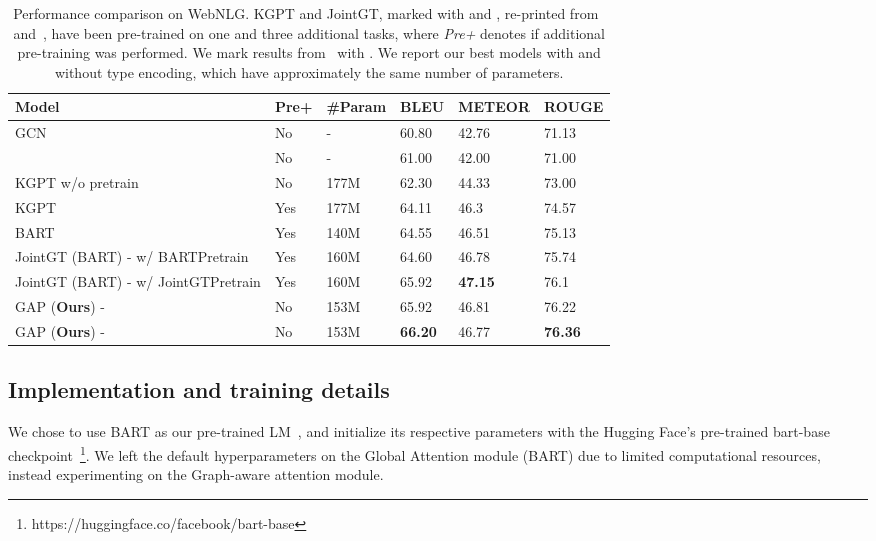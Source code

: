 \documentclass[11pt]{article}
\begin{document}
\begin{table*}[t]
\centering
\begin{tabular}{l|l|llll}
\hline
Model                                                           & Pre+ &\#Param & BLEU             & METEOR                    & ROUGE            \\ \hline
GCN~\cite{marcheggiani2018deep}                                                      & No & -      & 60.80  & 42.76            & 71.13  \\ ~\citet{shimorina2018handling}                                                      & No & -      & 61.00  & 42.00           & 71.00  \\ 

KGPT w/o pretrain & No                                                   & 177M      & 62.30   & 44.33            & 73.00  \\ 

KGPT & Yes                                                            & 177M   & 64.11 & 46.3           & 74.57 \\  
BART & Yes                                                            & 140M   & 64.55            & 46.51                     & 75.13            \\ 
JointGT (BART) - w/ BARTPretrain  & Yes                               & 160M   & 64.60 & 46.78          & 75.74 \\ 
JointGT (BART) - w/ JointGTPretrain & Yes                         & 160M   & 65.92 & \textbf{47.15} & 76.1  \\ \hline
GAP (\textbf{Ours}) -    & No & 153M   & 65.92            & 46.81                     & 76.22            \\ 
GAP (\textbf{Ours}) -    & No & 153M   & \textbf{66.20}   & 46.77                     & \textbf{76.36}   \\ \hline
\end{tabular}
\caption{\label{tab:Main-WebNLG} Performance comparison on WebNLG. KGPT and JointGT, marked with  and , re-printed from~\citet{chen-etal-2020-kgpt} and~\citet{ke-etal-2021-jointgt}, have been pre-trained on one and three additional tasks, where \textit{Pre+} denotes if additional pre-training was performed. We mark results from~\citet{shimorina2018handling} with . We report our best models with and without type encoding, which have approximately the same number of parameters.}
\end{table*}



\subsection{Implementation and training details}
We chose to use BART as our pre-trained LM~\cite{lewis2020bart}, and initialize its respective parameters with the Hugging Face's pre-trained bart-base checkpoint~\footnote{https://huggingface.co/facebook/bart-base}. We left the default hyperparameters on the Global Attention module (BART) due to limited computational resources, instead experimenting on the Graph-aware attention module. 
\end{document}
